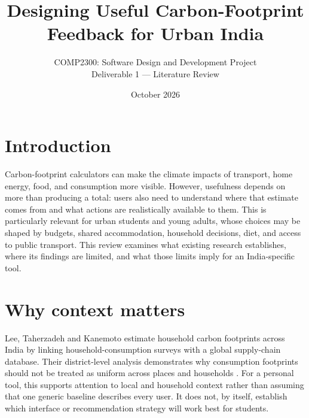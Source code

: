 \documentclass[10pt,a4paper,twocolumn]{article}
\title{\vspace{-1.25em}\Large\bfseries Designing Useful Carbon-Footprint Feedback for Urban India}
\author{\normalsize COMP2300: Software Design and Development Project\\[-1pt]
\small Deliverable 1 --- Literature Review}
\date{\small October 2026}
\begin{document}

\section{Introduction}
Carbon-footprint calculators can make the climate impacts of transport, home energy, food, and consumption more visible. However, usefulness depends on more than producing a total: users also need to understand where that estimate comes from and what actions are realistically available to them. This is particularly relevant for urban students and young adults, whose choices may be shaped by budgets, shared accommodation, household decisions, diet, and access to public transport. This review examines what existing research establishes, where its findings are limited, and what those limits imply for an India-specific tool.

\section{Why context matters}
Lee, Taherzadeh and Kanemoto estimate household carbon footprints across India by linking household-consumption surveys with a global supply-chain database. Their district-level analysis demonstrates why consumption footprints should not be treated as uniform across places and households \cite{lee2021}. For a personal tool, this supports attention to local and household context rather than assuming that one generic baseline describes every user. It does not, by itself, establish which interface or recommendation strategy will work best for students.
\end{document}

